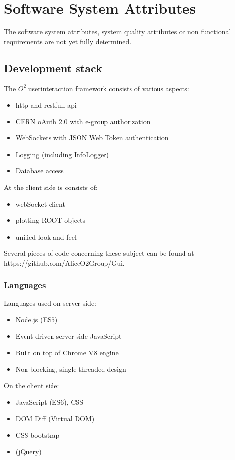 \section{Software System Attributes}
The software system attributes, system quality attributes or non functional requirements are not yet fully determined. 

\subsection{Development stack}
The $O^2$ userinteraction framework consists of various aspects:
\begin{itemize}
  \item http and restfull api
  \item CERN oAuth 2.0 with e-group authorization
  \item WebSockets with JSON Web Token authentication
  \item Logging (including InfoLogger)
  \item Database access
\end{itemize}

At the client side is consists of:
\begin{itemize}
  \item webSocket client
  \item plotting ROOT objects
  \item unified look and feel
\end{itemize}
Several pieces of code concerning these subject can be found at https://\-github.com/\-AliceO2Group/Gui.

\subsubsection{Languages}
Languages used on server side:
\begin{itemize}
  \item Node.js (ES6)
  \item Event-driven server-side JavaScript
  \item Built on top of Chrome V8 engine
  \item Non-blocking, single threaded design
\end{itemize}

On the client side:
\begin{itemize}
  \item JavaScript (ES6), CSS
  \item DOM Diff (Virtual DOM)
  \item CSS bootstrap
  \item (jQuery)
\end{itemize}

